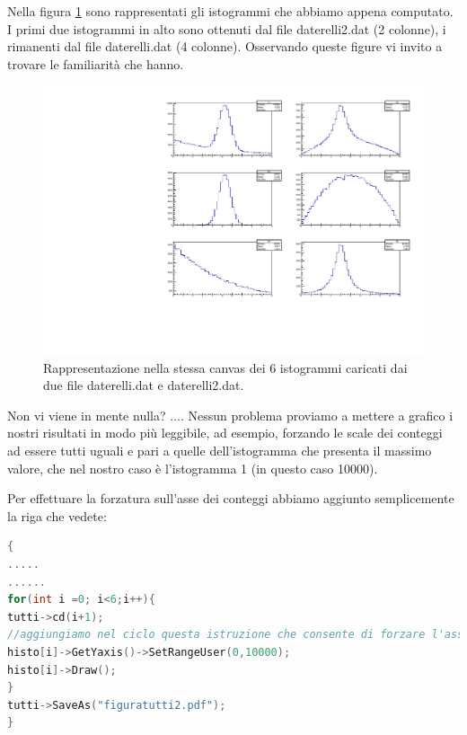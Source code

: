 \documentclass[11pt,fleqn]{book} %
\begin{document}
Nella figura \ref{fig6h1} sono rappresentati gli istogrammi che abbiamo appena computato. I primi due istogrammi in alto sono ottenuti dal file daterelli2.dat (2 colonne), i rimanenti dal file daterelli.dat (4 colonne). Osservando queste figure vi invito a trovare le familiarità che hanno.
\begin{figure}[h]
\centering
\includegraphics[scale=0.8]{Pictures/figuratutti.pdf}
\caption{Rappresentazione nella stessa canvas dei 6 istogrammi caricati dai due file daterelli.dat e daterelli2.dat. \label{fig6h1}}
\end{figure}

Non vi viene in mente nulla? .... Nessun problema proviamo a mettere a grafico i nostri risultati in modo più leggibile, ad esempio, forzando le scale dei conteggi ad essere tutti uguali e pari a quelle dell'istogramma che presenta il massimo valore, che nel nostro caso è l'istogramma 1 (in questo caso 10000).

Per effettuare la forzatura sull'asse dei conteggi abbiamo aggiunto semplicemente la riga che vedete:
\begin{lstlisting}[language=c++]
{
.....
......
for(int i =0; i<6;i++){
tutti->cd(i+1);
//aggiungiamo nel ciclo questa istruzione che consente di forzare l'asse y nel medesimo range di variabilita'
histo[i]->GetYaxis()->SetRangeUser(0,10000);
histo[i]->Draw();
}
tutti->SaveAs("figuratutti2.pdf");
}
\end{lstlisting}
\end{document}
